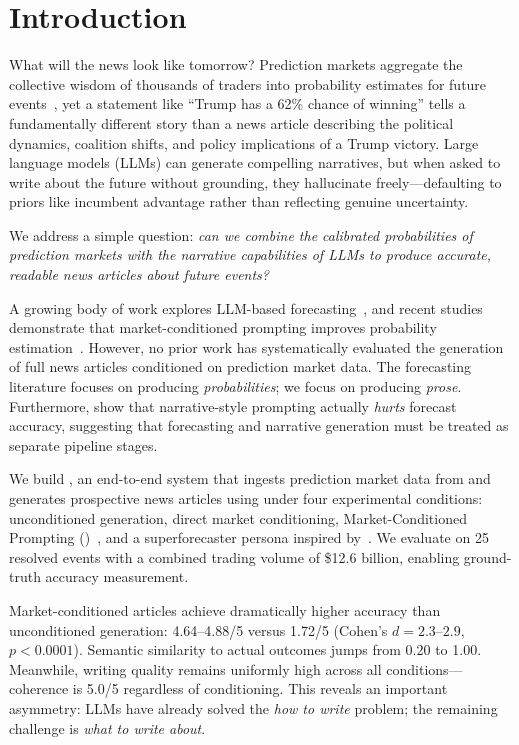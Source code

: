 \section{Introduction}
\label{sec:intro}

What will the news look like tomorrow? Prediction markets aggregate the collective wisdom of thousands of traders into probability estimates for future events~\citep{wolfers2004prediction}, yet a statement like ``Trump has a 62\% chance of winning'' tells a fundamentally different story than a news article describing the political dynamics, coalition shifts, and policy implications of a Trump victory. Large language models (LLMs) can generate compelling narratives, but when asked to write about the future without grounding, they hallucinate freely---defaulting to priors like incumbent advantage rather than reflecting genuine uncertainty.

We address a simple question: \emph{can we combine the calibrated probabilities of prediction markets with the narrative capabilities of LLMs to produce accurate, readable news articles about future events?}

 A growing body of work explores LLM-based forecasting~\citep{forecastbench2024, aiaforecaster2025, kalshibench2025}, and recent studies demonstrate that market-conditioned prompting improves probability estimation~\citep{mentionmarkets2026}. However, no prior work has systematically evaluated the generation of full news articles conditioned on prediction market data. The forecasting literature focuses on producing \emph{probabilities}; we focus on producing \emph{prose}. Furthermore, \citet{lu2025} show that narrative-style prompting actually \emph{hurts} forecast accuracy, suggesting that forecasting and narrative generation must be treated as separate pipeline stages.

 We build \systemname, an end-to-end system that ingests prediction market data from \polymarket and generates prospective news articles using \gptfour under four experimental conditions: unconditioned generation, direct market conditioning, Market-Conditioned Prompting (\mcp)~\citep{mentionmarkets2026}, and a superforecaster persona inspired by~\citet{tetlock2015superforecasting}. We evaluate on 25 resolved events with a combined trading volume of \$12.6 billion, enabling ground-truth accuracy measurement.

 Market-conditioned articles achieve dramatically higher accuracy than unconditioned generation: 4.64--4.88/5 versus 1.72/5 (Cohen's $d = 2.3$--$2.9$, $p < 0.0001$). Semantic similarity to actual outcomes jumps from 0.20 to 1.00. Meanwhile, writing quality remains uniformly high across all conditions---coherence is 5.0/5 regardless of conditioning. This reveals an important asymmetry: LLMs have already solved the \emph{how to write} problem; the remaining challenge is \emph{what to write about}.

